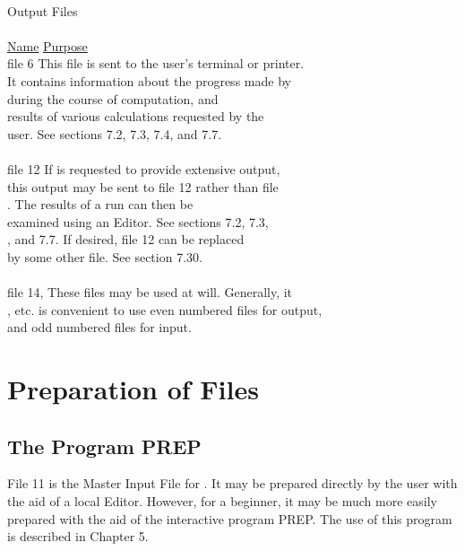 \begin{tabbing}
\vspace{3 mm} \\
\noindent Output Files \\
\vspace{2 mm} \\
\>\underline{Name}   \> \underline{Purpose} \\
\>       file  6      \> This file is sent to the user's terminal or printer. \\
\>                    \> It contains information about the progress made by \\
\>                    \> \Mary during the course of computation, and \\
\>                    \> results of various calculations requested by the \\
\>                    \> user.  See sections 7.2, 7.3, 7.4, and 7.7. \\
                      \\
\>       file 12      \> If \Mary is requested to provide extensive output, \\
\>                    \> this output may be sent to file 12 rather than file \\
\>                    .  The results of a \Mary run can then be \\
\>                    \> examined using an Editor.  See sections 7.2, 7.3, \\
\>                    , and 7.7.  If desired, file 12 can be replaced \\
\>                    \> by some other file.  See section 7.30.\\
                      \\
\>       file 14,     \> These files may be used at will.  Generally, it \\
, etc.     \> is convenient to use even numbered files for output, \\
\>                    \> and odd numbered files for input.
\end{tabbing}

\section{Preparation of Files}

\subsection{The Program PREP}
     File 11 is the Master Input File for \Maryend.  It may be prepared
directly by the user with the aid of a local Editor.  However, for a beginner, it may be much more easily prepared with the aid
of the interactive program PREP.  The use of this program is described in
Chapter 5.

